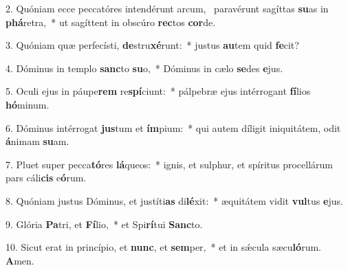 2. Quóniam ecce peccatóres intendérunt arcum, \dag\  paravérunt sagíttas \textbf{su}as in \textbf{phá}retra,~*  ut sagíttent in obscúro \textbf{rec}tos \textbf{cor}de.\

3. Quóniam quæ perfecísti, \textbf{de}stru\textbf{xé}runt:~*  justus \textbf{au}tem quid \textbf{fe}cit?\

4. Dóminus in templo \textbf{sanc}to \textbf{su}o,~*  Dóminus in cælo \textbf{se}des \textbf{e}jus.\

5. Oculi ejus in páupe\textbf{rem} re\textbf{spí}ciunt:~*  pálpebræ ejus intérrogant \textbf{fí}lios \textbf{hó}minum.\

6. Dóminus intérrogat \textbf{jus}tum et \textbf{ím}pium:~*  qui autem díligit iniquitátem, odit \textbf{á}nimam \textbf{su}am.\

7. Pluet super pecca\textbf{tó}res \textbf{lá}queos:~*  ignis, et sulphur, et spíritus procellárum pars cáli\textbf{cis} e\textbf{ó}rum.\

8. Quóniam justus Dóminus, et justíti\textbf{as} di\textbf{lé}xit:~*  æquitátem vidit \textbf{vul}tus \textbf{e}jus.\

9. Glória \textbf{Pa}tri, et \textbf{Fí}lio,~*  et Spi\textbf{rí}tui \textbf{Sanc}to.\

10. Sicut erat in princípio, et \textbf{nunc}, et \textbf{sem}per,~*  et in sǽcula sæcu\textbf{ló}rum. \textbf{A}men.\

